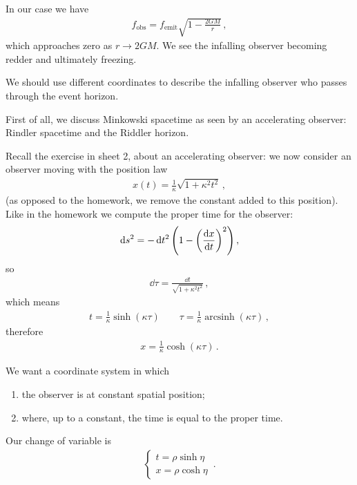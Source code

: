 \documentclass[main.tex]{subfiles}
\begin{document}
In our case we have 
%
\begin{align}
  f _{\text{obs}} = f _{\text{emit}} \sqrt{1 - \frac{2GM}{r}}
\,,
\end{align}
%
which approaches zero as \(r \rightarrow 2GM\). 
We see the infalling observer becoming redder and ultimately freezing. 

We should use different coordinates to describe the infalling observer who passes through the event horizon. 

First of all, we discuss Minkowski spacetime as seen by an accelerating observer: Rindler spacetime and the Riddler horizon. 

Recall the exercise in sheet 2, about an accelerating observer: we now consider an observer moving with the position law 
%
\begin{align}
  x(t) = \frac{1}{\kappa } \sqrt{1 + \kappa^2t^2}
\,,
\end{align}
%
(as opposed to the homework, we remove the constant added to this position).
Like in the homework we compute the proper time for the observer: 
%
\begin{align}
  \dd{s^2} = - \dd{t^2} \qty(1 - \qty(\dv{x}{t})^2)
\,,
\end{align}
%
so 
%
\begin{align}
  \dd{\tau} = \frac{ \dd{t}}{\sqrt{1 + \kappa^2t^2}}
\,,
\end{align}
%
which means 
%
\begin{align}
t = \frac{1}{\kappa } \operatorname{sinh} (\kappa \tau )
    \qquad 
\tau  = \frac{1}{\kappa } \operatorname{arcsinh} (\kappa \tau )
\,,
\end{align}
%
therefore 
%
\begin{align}
  x = \frac{1}{\kappa } \cosh(\kappa \tau )
\,.
\end{align}
%

We want a coordinate system in which 
\begin{enumerate}
    \item the observer is at constant spatial position;
    \item where, up to a constant, the time is equal to the proper time.
\end{enumerate}

Our change of variable is 
%
\begin{subequations}
\begin{align}
  \begin{cases}
      t = \rho \sinh \eta  \\
      x = \rho \cosh \eta 
  \end{cases}
\,.
\end{align}
\end{subequations}
%
\end{document}
